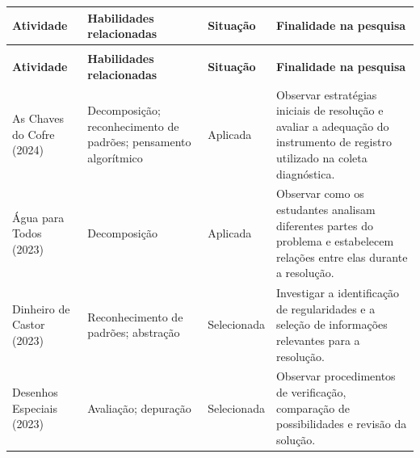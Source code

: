 {
\captionsetup{
    type=quadro,
    font=footnotesize,
    justification=raggedright,
    singlelinecheck=false
}

\label{quad:atividades-bebras}

\footnotesize
\renewcommand{\arraystretch}{1.15}

\begin{xltabular}{\textwidth}{
    |>{\raggedright\arraybackslash}p{2.7cm}
    |>{\raggedright\arraybackslash}p{3.5cm}
    |>{\raggedright\arraybackslash}p{2.4cm}
    |>{\raggedright\arraybackslash}X|}
    \hline

    \textbf{Atividade} &
    \textbf{Habilidades relacionadas} &
    \textbf{Situação} &
    \textbf{Finalidade na pesquisa} \\
    \hline
    \endfirsthead

     \\[2mm]

    \hline
    \textbf{Atividade} &
    \textbf{Habilidades relacionadas} &
    \textbf{Situação} &
    \textbf{Finalidade na pesquisa} \\
    \hline
    \endhead

    As Chaves do Cofre (2024) &
    Decomposição; reconhecimento de padrões; pensamento algorítmico &
    Aplicada &
    Observar estratégias iniciais de resolução e avaliar a adequação do instrumento de registro utilizado na coleta diagnóstica. \\
    \hline

    Água para Todos (2023) &
    Decomposição &
    Aplicada &
    Observar como os estudantes analisam diferentes partes do problema e estabelecem relações entre elas durante a resolução. \\
    \hline

    Dinheiro de Castor (2023) &
    Reconhecimento de padrões; abstração &
    Selecionada &
    Investigar a identificação de regularidades e a seleção de informações relevantes para a resolução. \\
    \hline

    Desenhos Especiais (2023) &
    Avaliação; depuração &
    Selecionada &
    Observar procedimentos de verificação, comparação de possibilidades e revisão da solução. \\
    \hline


\end{xltabular}}
